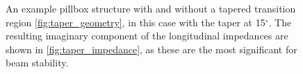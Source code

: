 \begin{figure}
\caption{An example pillbox structure with and without a tapered transition region \ref{fig:taper_geometry}, in this case with the taper at 15$^{\circ}$. The resulting imaginary component of the longitudinal impedances are shown in \ref{fig:taper_impedance}, as these are the most significant for beam stability.}
\label{fig:taper_ex}
\end{figure}

